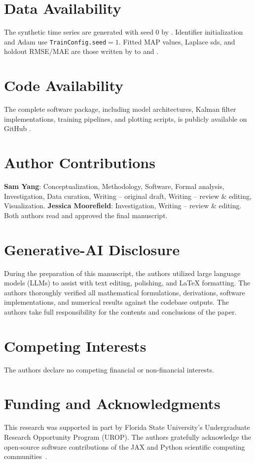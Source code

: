 \documentclass[11pt,letterpaper]{article}
\begin{document}
\section*{Data Availability}
The synthetic time series are generated with seed $0$ by . Identifier initialization and Adam use \texttt{TrainConfig.seed}${}=1$. Fitted MAP values, Laplace sds, and holdout RMSE/MAE are those written by  to  and .

\section*{Code Availability}
The complete software package, including model architectures, Kalman filter implementations, training pipelines, and plotting scripts, is publicly available on GitHub \cite{yang2026pinde}.

\section*{Author Contributions}
\textbf{Sam Yang}: Conceptualization, Methodology, Software, Formal analysis, Investigation, Data curation, Writing -- original draft, Writing -- review \& editing, Visualization. \textbf{Jessica Moorefield}: Investigation, Writing -- review \& editing. Both authors read and approved the final manuscript.

\section*{Generative-AI Disclosure}
During the preparation of this manuscript, the authors utilized large language models (LLMs) to assist with text editing, polishing, and LaTeX formatting. The authors thoroughly verified all mathematical formulations, derivations, software implementations, and numerical results against the codebase outputs. The authors take full responsibility for the contents and conclusions of the paper.

\section*{Competing Interests}
The authors declare no competing financial or non-financial interests.

\section*{Funding and Acknowledgments}
This research was supported in part by Florida State University's Undergraduate Research Opportunity Program (UROP). The authors gratefully acknowledge the open-source software contributions of the JAX and Python scientific computing communities~\cite{bradbury2018}.
\end{document}
